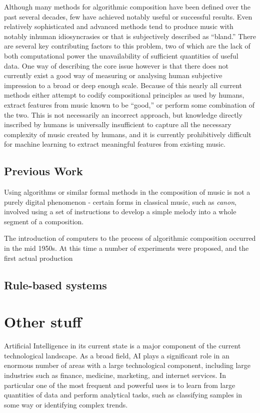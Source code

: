 \documentclass[ author={Stephen Livermore-Tozer},
				supervisor={Dr. Peter Flach},
				degree={MEng},
				title={Performing Algorithmic Co-composition Using Machine Learning},
				subtitle={},
				type={research},
				year={2016} ]{dissertation}
\begin{document}
	Although many methods for algorithmic composition have been defined over the past several decades, few have achieved notably useful or successful results. Even relatively sophisticated and advanced methods tend to produce music with notably inhuman idiosyncrasies or that is subjectively described as ``bland.'' There are several key contributing factors to this problem, two of which are the lack of both computational power the unavailability of sufficient quantities of useful data. One way of describing the core issue however is that there does not currently exist a good way of measuring or analysing human subjective impression to a broad or deep enough scale. Because of this nearly all current methods either attempt to codify compositional principles as used by humans, extract features from music known to be ``good,'' or perform some combination of the two. This is not necessarily an incorrect approach, but knowledge directly inscribed by humans is universally insufficient to capture all the necessary complexity of music created by humans, and it is currently prohibitively difficult for machine learning to extract meaningful features from existing music.
	
	\subsection{Previous Work}
	
	Using algorithms or similar formal methods in the composition of music is not a purely digital phenomenon - certain forms in classical music, such as \textit{canon}, involved using a set of instructions to develop a simple melody into a whole segment of a composition. 
	
	The introduction of computers to the process of algorithmic composition occurred in the mid 1950s. At this time a number of experiments were proposed, and the first actual production 	
	
	\subsection{Rule-based systems}
	
	\section{Other stuff}
	
	Artificial Intelligence in its current state is a major component of the current technological landscape. As a broad field, AI plays a significant role in an enormous number of areas with a large technological component, including large industries such as finance, medicine, marketing, and internet services. In particular one of the most frequent and powerful uses is to learn from large quantities of data and perform analytical tasks, such as classifying samples in some way or identifying complex trends. 
	
\end{document}
